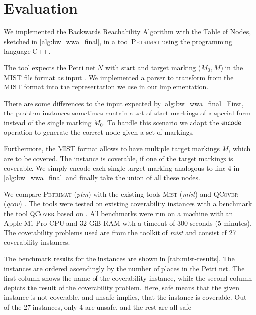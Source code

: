 \chapter{Evaluation}\label{chapter:evaluation}
We implemented the Backwards Reachability Algorithm with the Table of Nodes, sketched in \autoref{alg:bw_wwa_final}, in a tool \textsc{Petrimat} using the programming language C++. 

The tool expects the Petri net $N$ with start and target marking ($M_{0},M$) in the MIST file format as input \cite{ganty_15}. We implemented a parser to transform from the MIST format into the representation we use in our implementation. 

There are some differences to the input expected by \autoref{alg:bw_wwa_final}. First, the problem instances sometimes contain a set of start markings of a special form instead of the single marking $M_{0}$. To handle this scenario we adapt the $\operatorname{\textsf{encode}}$ operation to generate the correct node given a set of markings. 

Furthermore, the MIST format allows to have multiple target markings $M$, which are to be covered. The instance is coverable, if one of the target markings is coverable. We simply encode each single target marking analogous to line 4 in \autoref{alg:bw_wwa_final} and finally take the union of all these nodes.

We compare \textsc{Petrimat} (\textit{ptm}) with the existing tools \textsc{Mist} (\textit{mist}) and \textsc{QCover} (\textit{qcov})  \cite{ganty_15,blondin_15}. 
The tools were tested on existing coverability instances with a benchmark the tool \textsc{QCover} based on \cite{blondin_16}.  All benchmarks were run on a machine with an Apple M1 Pro CPU and 32 GiB RAM with a timeout of 300 seconds (5 minutes). 
The coverability problems used are from the toolkit of \textit{mist} and consist of 27 coverability instances. 

\bigbreak

The benchmark results for the instances are shown in \autoref{tab:mist-results}.
The instances are ordered ascendingly by the number of places in the Petri net. The first column shows the name of the coverability instance, while the second column depicts the result of the coverability problem. Here, safe means that the given instance is not coverable, and unsafe implies, that the instance is coverable.
Out of the 27 instances, only 4 are unsafe, and the rest are all safe. 

